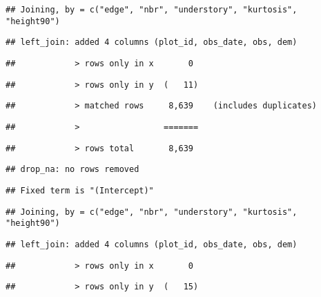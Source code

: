 \documentclass[
]{article}
\begin{document}
\begin{verbatim}
## Joining, by = c("edge", "nbr", "understory", "kurtosis", "height90")
\end{verbatim}

\begin{verbatim}
## left_join: added 4 columns (plot_id, obs_date, obs, dem)
\end{verbatim}

\begin{verbatim}
##            > rows only in x       0
\end{verbatim}

\begin{verbatim}
##            > rows only in y  (   11)
\end{verbatim}

\begin{verbatim}
##            > matched rows     8,639    (includes duplicates)
\end{verbatim}

\begin{verbatim}
##            >                 =======
\end{verbatim}

\begin{verbatim}
##            > rows total       8,639
\end{verbatim}

\begin{verbatim}
## drop_na: no rows removed
\end{verbatim}

\begin{verbatim}
## Fixed term is "(Intercept)"
\end{verbatim}

\begin{verbatim}
## Joining, by = c("edge", "nbr", "understory", "kurtosis", "height90")
\end{verbatim}

\begin{verbatim}
## left_join: added 4 columns (plot_id, obs_date, obs, dem)
\end{verbatim}

\begin{verbatim}
##            > rows only in x       0
\end{verbatim}

\begin{verbatim}
##            > rows only in y  (   15)
\end{verbatim}
\end{document}
